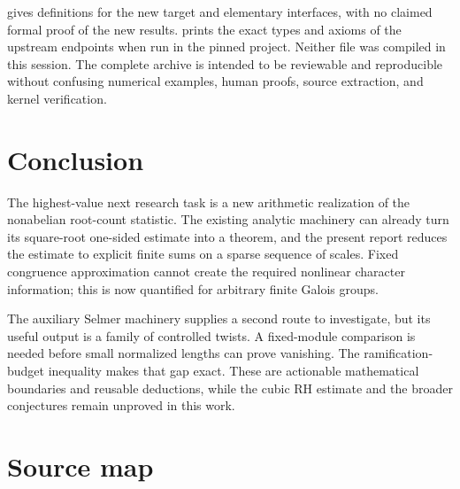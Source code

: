 \documentclass[11pt,letterpaper]{article}
\theoremstyle{definition}
\theoremstyle{remark}
\begin{document}
 gives definitions for the
new target and elementary interfaces, with no claimed formal proof of
the new results.  prints the exact types
and axioms of the upstream endpoints when run in the pinned project.
Neither file was compiled in this session. The complete archive is
intended to be reviewable and reproducible without confusing numerical
examples, human proofs, source extraction, and kernel verification.

\section{Conclusion}

The highest-value next research task is a new arithmetic realization of
the nonabelian root-count statistic. The existing analytic machinery can
already turn its square-root one-sided estimate into a theorem, and
the present report reduces the estimate to explicit finite sums on a
sparse sequence of scales. Fixed congruence approximation cannot create
the required nonlinear character information; this is now quantified
for arbitrary finite Galois groups.

The auxiliary Selmer machinery supplies a second route to investigate,
but its useful output is a family of controlled twists. A fixed-module
comparison is needed before small normalized lengths can prove
vanishing. The ramification-budget inequality makes that gap exact.
These are actionable mathematical boundaries and reusable deductions,
while the cubic RH estimate and the broader conjectures remain
unproved in this work.

\appendix
\section{Source map}
\end{document}
